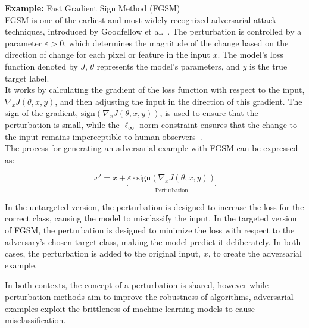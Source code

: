 \documentclass[a4paper, oneside]{discothesis}
\begin{document}
\begin{examplebox}
	\textbf{Example:} Fast Gradient Sign Method (FGSM) \\

	FGSM is one of the earliest and most widely recognized adversarial attack techniques, introduced by Goodfellow et al.~\cite{goodfellow2014explaining}. The perturbation is controlled by a parameter $\varepsilon > 0$, which determines the magnitude of the change based on the direction of change for each pixel or feature in the input $x$. The model's loss function denoted by $J$, $\theta$ represents the model's parameters, and $y$ is the true target label. \\
	
	It works by calculating the gradient of the loss function with respect to the input, $\nabla_x J(\theta, x, y)$, and then adjusting the input in the direction of this gradient. The sign of the gradient, $\text{sign}(\nabla_x J(\theta, x, y))$, is used to ensure that the perturbation is small, while the $\ell_\infty$-norm constraint ensures that the change to the input remains imperceptible to human observers~\cite{zhang2019adversarial}. \\
	
	The process for generating an adversarial example with FGSM can be expressed as:
	
	$$x' = x + \underbracket{\varepsilon \cdot \text{sign}(\nabla_x J(\theta, x, y))}_{\text{Perturbation}}$$
	
	In the untargeted version, the perturbation is designed to increase the loss for the correct class, causing the model to misclassify the input. In the targeted version of FGSM, the perturbation is designed to minimize the loss with respect to the adversary's chosen target class, making the model predict it deliberately. In both cases, the perturbation is added to the original input, $x$, to create the adversarial example.
\end{examplebox}

In both contexts, the concept of a perturbation is shared, however while perturbation methods aim to improve the robustness of algorithms, adversarial examples exploit the brittleness of machine learning models to cause misclassification.



\end{document}
